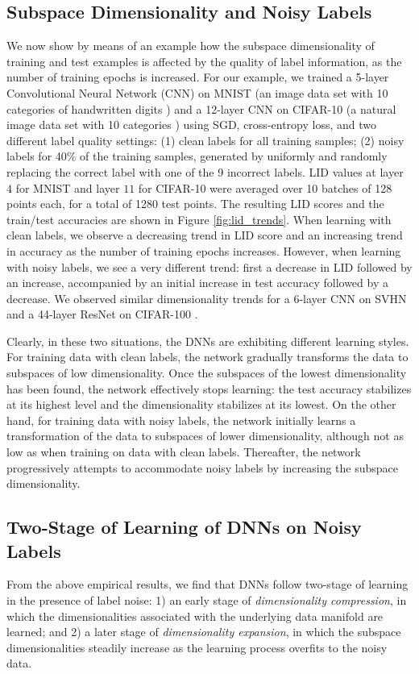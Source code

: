 \documentclass{article}
\begin{document}
\subsection{Subspace Dimensionality and Noisy Labels}\label{sec:subsapce_dimensionality}
We now show by means of an example how the subspace dimensionality of training and test examples is affected by the quality of label information, as the number of training epochs is increased.
For our example, we trained a 5-layer Convolutional Neural Network (CNN) on MNIST (an image data set with 10 categories of handwritten digits \cite{lecun1998gradient}) and a 12-layer CNN on CIFAR-10 (a natural image data set with 10 categories \cite{krizhevsky2009learning}) using SGD, cross-entropy loss, and two different label quality settings: (1) clean labels for all training samples; (2) noisy labels for 40\% of the training samples, generated by uniformly and randomly replacing the correct label with one of the 9 incorrect labels. LID values at layer $4$ for MNIST and layer $11$ for CIFAR-10 were averaged over 10 batches of 128 points each, for a total of 1280 test points. The resulting LID scores and the train/test accuracies are shown in Figure \ref{fig:lid_trends}. When learning with clean labels, we observe a decreasing trend in LID score and an increasing trend in accuracy as the number of training epochs increases. However, when learning with noisy labels, we see a very different trend: first a decrease in LID followed by an increase, accompanied by an initial increase in test accuracy followed by a decrease. We observed similar dimensionality trends for a 6-layer CNN on SVHN \cite{netzer2011reading} and a 44-layer ResNet \cite{he2016deep} on CIFAR-100 \cite{krizhevsky2009learning}.

Clearly, in these two situations, the DNNs are exhibiting different learning styles. For training data with clean labels, the network gradually transforms the data to subspaces of low dimensionality. Once the subspaces of the lowest dimensionality has been found, the network effectively stops learning: the test accuracy stabilizes at its highest level and the dimensionality stabilizes at its lowest. On the other hand, for training data with noisy labels, the network initially learns a transformation of the data to subspaces of lower dimensionality, although not as low as when training on data with clean labels. Thereafter, the network progressively attempts to accommodate noisy labels by increasing the subspace dimensionality. 

\subsection{Two-Stage of Learning of DNNs on Noisy Labels}
From the above empirical results, we find that DNNs follow two-stage of learning in the presence of label noise: 1) an early stage of {\em dimensionality compression}, in which the dimensionalities associated with the underlying data manifold are learned; and 2) a later stage of {\em dimensionality expansion}, in which the subspace dimensionalities steadily increase as the learning process overfits to the noisy data. 
\end{document}
